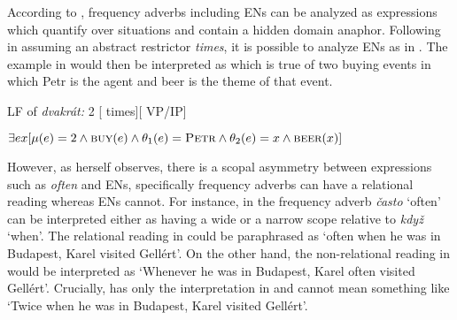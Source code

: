 \documentclass[output=paper,modfonts,hidelinks,newtxmath
\ChapterDOI{10.5281/zenodo.2545513}
]{langscibook}
\begin{document}
\ea\label{frequency-degree-adverbs} 
\z \z

\ea\label{event-degree-numerals} 
\z \z

\noindent According to \cite{von_fintel_restrictions_1994}, frequency adverbs including ENs can be analyzed as expressions which quantify over situations and contain a hidden domain anaphor. Following \cite{doetjes_adverbs_2007} in assuming an abstract restrictor \textit{times}, it is possible to analyze ENs as in . The example in  would then be interpreted as  which is true of two buying events in which Petr is the agent and beer is the theme of that event.

\ea\label{dvakrat-LF} LF of \textit{dvakrát:} 2 [ times][ VP/IP]
\z

\ea\label{dvakrat-interpretation} $\exists ex[\mu(e)=2 \wedge \textsc{buy}(e) \wedge \theta_1(e)=\textsc{Petr} \wedge \theta_2(e)=x \wedge \textsc{beer}(x)]$
\z 

\noindent However, as \cite{doetjes_adverbs_2007} herself observes, there is a scopal asymmetry between expressions such as \textit{often} and ENs, specifically frequency adverbs can have a relational reading whereas ENs cannot. For instance, in  the frequency adverb \textit{často} `often' can be interpreted either as having a wide or a narrow scope relative to \textit{když} `when'. The relational reading in  could be paraphrased as `often when he was in Budapest, Karel visited Gellért'. On the other hand, the non-relational reading in  would be interpreted as `Whenever he was in Budapest, Karel often visited Gellért'. Crucially,  has only the interpretation in  and cannot mean something like `Twice when he was in Budapest, Karel visited Gellért'.
\end{document}
